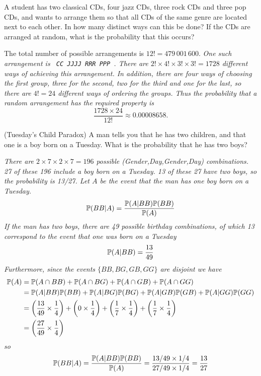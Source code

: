 \begin{exercise}
\begin{questions}
\question
A student has two classical CDs, four jazz CDs, three rock CDs and three pop CDs, and wants to arrange them so that all CDs of the same genre are located next to each other. In how many distinct ways can this be done? If the CDs are arranged at random, what is the probability that this occurs?
\begin{answer}
The total number of possible arrangements is $12!= 479\,001\,600$.
\bit
\it 
One such arrangement is \texttt{\,CC\,JJJJ\,RRR\,PPP\,}. There are $2!\times 4!\times 3!\times 3! = 1728$ different ways of achieving this arrangement. 
\it
In addition, there are four ways of choosing the first group, three for the second, two for the third and one for the last, so there are $4!= 24$ different ways of ordering the groups.
\it
Thus the probability that a random arrangement has the required property is 
\[
\displaystyle\frac{1728\times 24}{12!}\approx 0.00008658.
\]
\eit
\end{answer}

\question (Tuesday's Child Paradox)
A man tells you that he has two children, and that one is a boy born on a Tuesday. What is the probability that he has two boys?

\begin{answer}
\bit
\it There are $2\times 7\times 2\times 7 = 196$ possible (Gender,Day,Gender,Day) combinations.
\it 27 of these 196 include a boy born on a Tuesday.
\it 13 of these 27 have two boys, so the probability is 13/27.
\eit
Let $A$ be the event that the man has one boy born on a Tuesday.
\[
\mathbb{P}(BB|A) = \frac{\mathbb{P}(A|BB)\mathbb{P}(BB)}{\mathbb{P}(A)}
\]
If the man has two boys, there are 49 possible birthday combinations, of which 13 correspond to the event that one was born on a Tuesday 
\[
\mathbb{P}(A|BB) = \frac{13}{49}
\]
Furthermore, since the events $\{BB,BG,GB,GG\}$ are disjoint we have
\begin{align*}
\mathbb{P}(A) 
	& = \mathbb{P}(A\cap BB) + \mathbb{P}(A\cap BG) + \mathbb{P}(A\cap GB) + \mathbb{P}(A\cap GG) \\
	& = \mathbb{P}(A|BB)\mathbb{P}(BB) + \mathbb{P}(A|BG)\mathbb{P}(BG) + \mathbb{P}(A|GB)\mathbb{P}(GB) + \mathbb{P}(A|GG)\mathbb{P}(GG) \\
	& = \left(\frac{13}{49}\times\frac{1}{4}\right) + \left(0\times\frac{1}{4}\right) 
		+ \left(\frac{1}{7}\times\frac{1}{4}\right) + \left(\frac{1}{7}\times\frac{1}{4}\right) \\
	& = \left(\frac{27}{49}\times\frac{1}{4}\right)
\end{align*}
so
\[
\mathbb{P}(BB|A) = \frac{\mathbb{P}(A|BB)\mathbb{P}(BB)}{\mathbb{P}(A)} = \frac{13/49\times 1/4}{27/49\times 1/4} = \frac{13}{27}
\]
\end{answer}


\end{questions}
\end{exercise}
